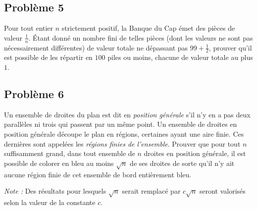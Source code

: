 \subsection*{Problème 5}
Pour tout entier $n$ strictement positif, la Banque du Cap émet des pièces de valeur $\frac{1}{n}$. Étant
donné un nombre fini de telles pièces (dont les valeurs ne sont pas nécessairement différentes) de valeur
totale ne dépassant pas $99 + \frac{1}{2}$, prouver qu'il est possible de les répartir en $100$ piles ou
moins, chacune de valeur totale au plus $1$.

\subsection*{Problème 6}
Un ensemble de droites du plan est dit en \emph{position générale} s'il n'y en a pas deux parallèles ni trois
qui passent par un même point. Un ensemble de droites en position générale découpe le plan en régions,
certaines ayant une aire finie. Ces dernières sont appelées les \emph{régions finies de l'ensemble}. Prouver
que pour tout $n$ suffisamment grand, dans tout ensemble de $n$ droites en position générale, il est possible
de colorer en bleu au moins $\sqrt{n}$ de ses droites de sorte qu'il n'y ait aucune région finie de cet
ensemble de bord entièrement bleu.

\emph{Note :} Des résultats pour lesquels $\sqrt{n}$ serait remplacé par $c\sqrt{n}$ seront valorisés selon la
valeur de la constante $c$.

